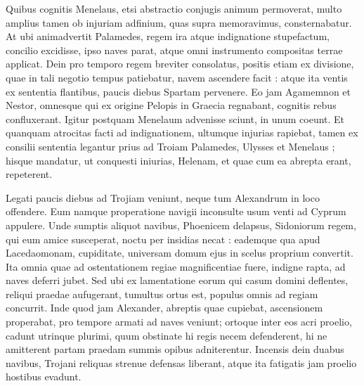 \documentclass{article}
\begin{document}
\begin{pages}
\begin{Rightside}
Quibus cognitis Menelaus, etsi abstractio conjugis animum permoverat, multo amplius tamen ob injuriam adfinium, quas supra memoravimus, consternabatur. At ubi animadvertit Palamedes, regem ira atque indignatione stupefactum, concilio excidisse, ipso naves parat, atque omni instrumento compositas terrae applicat. Dein pro temporo regem breviter consolatus, positis etiam ex divisione, quae in tali negotio tempus patiebatur, navem ascendere facit : atque ita ventis ex sententia flantibus, paucis diebus Spartam pervenere. Eo jam Agamemnon et Nestor, omnesque qui ex origine Pelopis in Graecia regnabant, cognitis rebus confluxerant. Igitur postquam Menelaum advenisse sciunt, in unum coeunt. Et quanquam atrocitas facti ad indignationem, ultumque injurias rapiebat, tamen ex consilii sententia legantur prius ad Troiam Palamedes, Ulysses et Menelaus ; hisque mandatur, ut conquesti iniurias, Helenam, et quae cum ea abrepta erant, repeterent.

Legati paucis diebus ad Trojiam veniunt, neque tum Alexandrum in loco offendere. Eum namque properatione navigii inconsulte usum venti ad Cyprum appulere. Unde sumptis aliquot navibus, Phoenicem delapsus, Sidoniorum regem, qui eum amice susceperat, noctu per insidias necat : eademque qua apud Lacedaomonam, cupiditate, universam domum ejus in scelus proprium convertit. Ita omnia quae ad ostentationem regiae magnificentiae fuere, indigne rapta, ad naves deferri jubet. Sed ubi ex lamentatione eorum qui casum domini deflentes, reliqui praedae aufugerant, tumultus ortus est, populus omnis ad regiam concurrit. Inde quod jam Alexander, abreptis quae cupiebat, ascensionem properabat, pro tempore armati ad naves veniunt; ortoque inter eos acri proelio, cadunt utrinque plurimi, quum obstinate hi regis necem defenderent, hi ne amitterent partam praedam summis opibus adniterentur. Incensis dein duabus navibus, Trojani reliquas strenue defensas liberant, atque ita fatigatis jam proelio hostibus evadunt.


\end{Rightside}
\end{pages}
\end{document}
